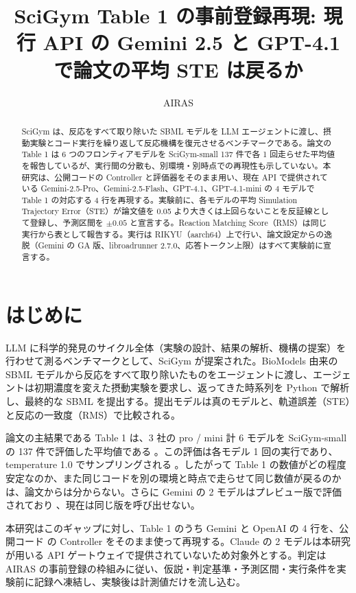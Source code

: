 \documentclass{article}
\title{SciGym Table 1 の事前登録再現: 現行 API の Gemini 2.5 と GPT-4.1 で論文の平均 STE は戻るか}
\author{AIRAS}
\begin{document}
\maketitle

\begin{abstract}
SciGym \citep{duan-2025-measuring} は、反応をすべて取り除いた SBML モデルを LLM エージェントに渡し、摂動実験とコード実行を繰り返して反応機構を復元させるベンチマークである。論文の Table 1 は 6 つのフロンティアモデルを SciGym-small 137 件で各 1 回走らせた平均値を報告しているが、実行間の分散も、別環境・別時点での再現性も示していない。本研究は、公開コードの Controller と評価器をそのまま用い、現在 API で提供されている Gemini-2.5-Pro、Gemini-2.5-Flash、GPT-4.1、GPT-4.1-mini の 4 モデルで Table 1 の対応する 4 行を再現する。実験前に、各モデルの平均 Simulation Trajectory Error（STE）が論文値を 0.05 より大きくは上回らないことを反証線として登録し、予測区間を $\pm 0.05$ と宣言する。Reaction Matching Score（RMS）は同じ実行から表として報告する。実行は RIKYU（aarch64）上で行い、論文設定からの逸脱（Gemini の GA 版、libroadrunner 2.7.0、応答トークン上限）はすべて実験前に宣言する。
\end{abstract}

\section{はじめに}
\label{sec:intro}
LLM に科学的発見のサイクル全体（実験の設計、結果の解析、機構の提案）を行わせて測るベンチマークとして、SciGym \citep{duan-2025-measuring} が提案された。BioModels 由来の SBML モデルから反応をすべて取り除いたものをエージェントに渡し、エージェントは初期濃度を変えた摂動実験を要求し、返ってきた時系列を Python で解析し、最終的な SBML を提出する。提出モデルは真のモデルと、軌道誤差（STE）と反応の一致度（RMS）で比較される。

論文の主結果である Table 1 は、3 社の pro / mini 計 6 モデルを SciGym-small の 137 件で評価した平均値である \cite[s1.p10]{duan-2025-measuring}。この評価は各モデル 1 回の実行であり、temperature 1.0 でサンプリングされる \cite[s2.p1]{h4duan-2025-scigym}。したがって Table 1 の数値がどの程度安定なのか、また同じコードを別の環境と時点で走らせて同じ数値が戻るのかは、論文からは分からない。さらに Gemini の 2 モデルはプレビュー版で評価されており \cite[s1.p1]{duan-2025-measuring}、現在は同じ版を呼び出せない。

本研究はこのギャップに対し、Table 1 のうち Gemini と OpenAI の 4 行を、公開コード \citep{h4duan-2025-scigym} の Controller をそのまま使って再現する。Claude の 2 モデルは本研究が用いる API ゲートウェイで提供されていないため対象外とする。判定は AIRAS の事前登録の枠組みに従い、仮説・判定基準・予測区間・実行条件を実験前に記録へ凍結し、実験後は計測値だけを流し込む。
\end{document}
